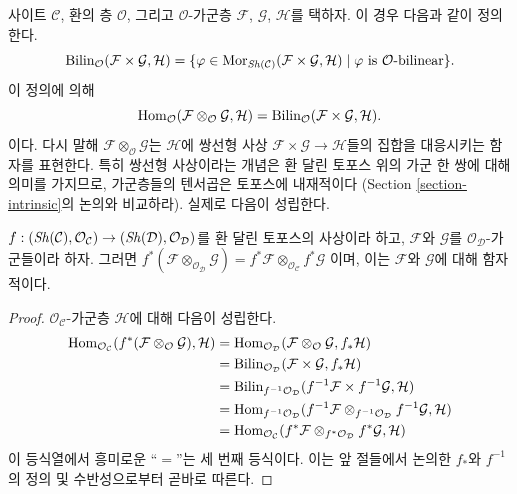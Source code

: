 \noindent
사이트 $\mathcal{C}$, 환의 층 $\mathcal{O}$, 그리고
$\mathcal{O}$-가군층 $\mathcal{F}$, $\mathcal{G}$, $\mathcal{H}$를 택하자.
이 경우 다음과 같이 정의한다.
$$
\text{Bilin}_\mathcal{O}(\mathcal{F} \times \mathcal{G}, \mathcal{H})
=
\{\varphi \in
\mathop{\mathrm{Mor}}\nolimits_{\mathop{\mathit{Sh}}\nolimits(\mathcal{C})}(
\mathcal{F} \times \mathcal{G}, \mathcal{H}) \mid
\varphi \text{ is }\mathcal{O}\text{-bilinear}\}.
$$
이 정의에 의해
$$
\mathop{\mathrm{Hom}}\nolimits_\mathcal{O}
(\mathcal{F} \otimes_\mathcal{O} \mathcal{G}, \mathcal{H})
=
\text{Bilin}_\mathcal{O}(\mathcal{F} \times \mathcal{G}, \mathcal{H}).
$$
이다. 다시 말해 $\mathcal{F} \otimes_\mathcal{O} \mathcal{G}$는
$\mathcal{H}$에 쌍선형 사상
$\mathcal{F} \times \mathcal{G} \to \mathcal{H}$들의 집합을 대응시키는
함자를 표현한다. 특히 쌍선형 사상이라는 개념은 환 달린 토포스 위의 가군
한 쌍에 대해 의미를 가지므로, 가군층들의 텐서곱은 토포스에 내재적이다
(Section \ref{section-intrinsic}의 논의와 비교하라). 실제로 다음이
성립한다.

\begin{lemma}
\label{lemma-tensor-product-pullback}
$f : (\mathop{\mathit{Sh}}\nolimits(\mathcal{C}), \mathcal{O}_\mathcal{C})
\to (\mathop{\mathit{Sh}}\nolimits(\mathcal{D}), \mathcal{O}_\mathcal{D})$를 환 달린 토포스의
사상이라 하고, $\mathcal{F}$와 $\mathcal{G}$를
$\mathcal{O}_\mathcal{D}$-가군들이라 하자. 그러면
$f^*(\mathcal{F} \otimes_{\mathcal{O}_\mathcal{D}} \mathcal{G})
= f^*\mathcal{F} \otimes_{\mathcal{O}_\mathcal{C}} f^*\mathcal{G}$
이며, 이는 $\mathcal{F}$와 $\mathcal{G}$에 대해 함자적이다.
\end{lemma}

\begin{proof}
$\mathcal{O}_\mathcal{C}$-가군층 $\mathcal{H}$에 대해 다음이 성립한다.
\begin{align*}
\mathop{\mathrm{Hom}}\nolimits_{\mathcal{O}_\mathcal{C}}(
f^*(\mathcal{F} \otimes_\mathcal{O} \mathcal{G}), \mathcal{H})
& =
\mathop{\mathrm{Hom}}\nolimits_{\mathcal{O}_\mathcal{D}}(
\mathcal{F} \otimes_\mathcal{O} \mathcal{G}, f_*\mathcal{H}) \\
& =
\text{Bilin}_{\mathcal{O}_\mathcal{D}}(
\mathcal{F} \times \mathcal{G}, f_*\mathcal{H}) \\
& =
\text{Bilin}_{f^{-1}\mathcal{O}_\mathcal{D}}(
f^{-1}\mathcal{F} \times f^{-1}\mathcal{G}, \mathcal{H}) \\
& =
\mathop{\mathrm{Hom}}\nolimits_{f^{-1}\mathcal{O}_\mathcal{D}}(
f^{-1}\mathcal{F} \otimes_{f^{-1}\mathcal{O}_\mathcal{D}} f^{-1}\mathcal{G},
\mathcal{H}) \\
& =
\mathop{\mathrm{Hom}}\nolimits_{\mathcal{O}_\mathcal{C}}(
f^*\mathcal{F} \otimes_{f^*\mathcal{O}_\mathcal{D}} f^*\mathcal{G},
\mathcal{H})
\end{align*}
이 등식열에서 흥미로운 ``$=$''는 세 번째 등식이다. 이는 앞 절들에서
논의한 $f_*$와 $f^{-1}$의 정의 및 수반성으로부터 곧바로 따른다.
\end{proof}

